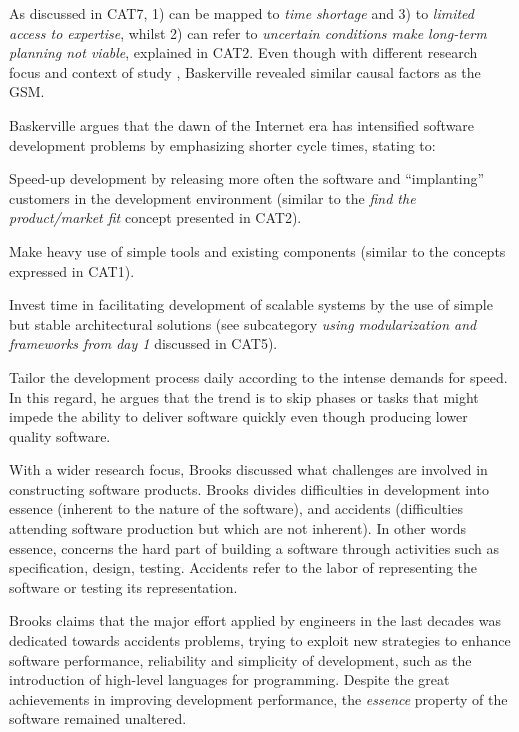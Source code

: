 \documentclass[10pt,journal,letterpaper,compsoc]{IEEEtran}
\begin{document}
As discussed in CAT7, 1) can be mapped to \textit{time shortage} and 3) to 
\textit{limited access to expertise}, whilst  2) can refer to \textit{uncertain 
conditions make long-term planning not viable}, explained in CAT2. Even though 
with different research focus and context of study %
, Baskerville revealed similar causal factors as the GSM.

Baskerville argues that the dawn of the Internet era has intensified software 
development problems by emphasizing shorter cycle times, stating to:

\begin{compactitem}
\item Speed-up development by releasing more often the software and 
``implanting'' customers in the development environment (similar to the 
\textit{find the product/market fit} concept presented in CAT2). 
\item Make heavy use of simple tools and existing components (similar to the 
concepts expressed in CAT1).
\item Invest time in facilitating development of scalable systems by the use of 
simple but stable architectural solutions (see subcategory \textit{using 
modularization and frameworks from day 1} discussed in CAT5). 
\item Tailor the development process daily according to the intense demands for 
speed. In this regard, he argues that the trend is to skip phases or tasks that 
might impede the ability to deliver software quickly even though producing lower 
quality software.
  

\end{compactitem}


With a wider research focus, Brooks \cite{BrooksJr1987} discussed what 
challenges are involved in constructing software products. Brooks divides 
difficulties in development into essence (inherent to the nature of the 
software), and accidents (difficulties attending software production but which 
are not inherent). In other words essence, concerns the hard part of building a 
software through activities such as specification, design, testing. Accidents 
refer to the labor of representing the software or testing its representation.

Brooks claims that the major effort applied by engineers in the last decades 
was dedicated towards accidents problems, trying to exploit new strategies to 
enhance software performance, reliability and simplicity of development, such as 
the introduction of high-level languages for programming.  Despite the great 
achievements in improving development performance, the \textit{essence} property 
of the software remained unaltered.
\end{document}
